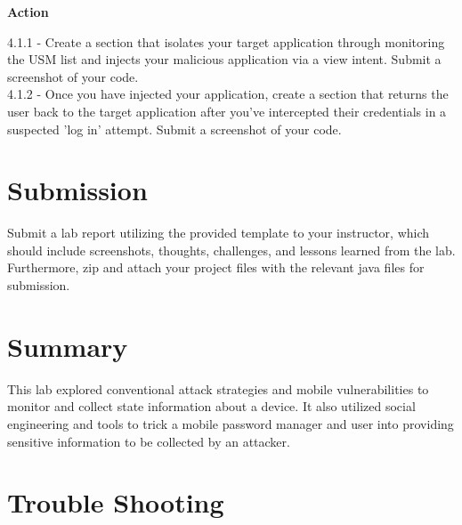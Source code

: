 \documentclass[letterpaper,12pt]{report}
\begin{document}
\begin{mdframed}[backgroundcolor=blue!10,style=code,nobreak=true,align=center,userdefinedwidth=14cm]

\textbf{Action}
\bigskip

4.1.1 - Create a section that isolates your target application through monitoring the USM list and injects your malicious application via a view intent. Submit a screenshot of your code.\\
4.1.2 - Once you have injected your application, create a section that returns the user back to the target application after you've intercepted their credentials in a suspected 'log in' attempt. Submit a screenshot of your code.\\
\end{mdframed}


\section*{Submission}\label{sec:Submission}

Submit a lab report utilizing the provided template to your instructor, which should include screenshots, thoughts, challenges, and lessons learned from the lab. Furthermore, zip and attach your project files with the relevant java files for submission.


\section*{Summary}\label{sec:Summary}

This lab explored conventional attack strategies and mobile vulnerabilities to monitor and collect state information about a device. It also utilized social engineering and tools to trick a mobile password manager and user into providing sensitive information to be collected by an attacker.

\bigskip
\bigskip
\bigskip
\bigskip
\bigskip
\bigskip
\bigskip
\bigskip
\bigskip
\bigskip


\section*{Trouble Shooting}\label{sec:Trouble Shooting}
\end{document}
